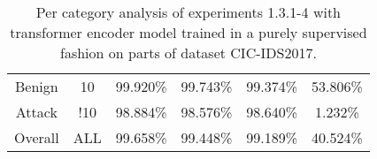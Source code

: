 \begin{table}[htb]
{\begin{tabular}{@{}cccccc@{}}
         \\
        Benign &  10 &  99.920\% &  99.743\% &  99.374\% &  53.806\% \\
        Attack &  !10 &  98.884\% &  98.576\% &  98.640\% &  1.232\% \\
        Overall &  ALL &  99.658\% &  99.448\% &  99.189\% &  40.524\% \\
        \bottomrule
    \end{tabular}}
    \caption{Per category analysis of experiments 1.3.1-4 with transformer encoder model trained in a purely supervised fashion on parts of dataset CIC-IDS2017.}
    \label{table:results:lstm:class_flows_supervised}
\end{table}
